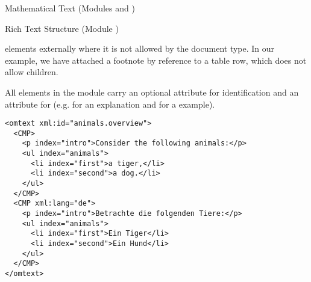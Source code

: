 \begin{tchapter}[id=mtxt,short=Mathematical Text]{Mathematical Text (Modules
  {} and {})}
\begin{tsection}[id=rt,short=Rich Text Structure]{Rich Text Structure (Module {})}
\begin{description}
  elements externally where it is not allowed by the {\omdoc} document type. In our
  example, we have attached a footnote by reference to a table row, which does not allow
  {} children.
\end{description}
  All elements in the {} module carry an optional
  {} attribute for identification and an
  {} attribute for
  {} (e.g. {} for an
  explanation and {} for a {} example).

\begin{lstlisting}[label=lst:parallel-multiling,
   caption={Multilingual Parallel Markup},
   index={omtext,CMP,ul,li,p}]
<omtext xml:id="animals.overview">
  <CMP>
    <p index="intro">Consider the following animals:</p>
    <ul index="animals">
      <li index="first">a tiger,</li>
      <li index="second">a dog.</li>
    </ul>
  </CMP>
  <CMP xml:lang="de">
    <p index="intro">Betrachte die folgenden Tiere:</p>
    <ul index="animals">
      <li index="first">Ein Tiger</li>
      <li index="second">Ein Hund</li>
    </ul>
  </CMP>
</omtext>
\end{lstlisting}
\end{tsection}
\end{tchapter}

